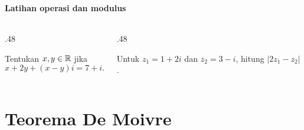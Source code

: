 \documentclass{../../kalkulus-ppt}
\begin{document}
\begin{frame}
    \frametitle{\insertsection}
    \framesubtitle{Latihan operasi dan modulus}
    \begin{columns}[T,onlytextwidth]
        \begin{column}{.48\textwidth}
            \begin{contoh}
                Tentukan $x,y\in\mathbb{R}$ jika
                \[
                    x+2y+(x-y)i=7+i.
                \]
            \end{contoh}
        \end{column}
        \begin{column}{.48\textwidth}
            \begin{contoh}
                Untuk $z_1=1+2i$ dan $z_2=3-i$, hitung $|2z_1-z_2|$.
            \end{contoh}
        \end{column}
    \end{columns}
\end{frame}

\section{Teorema De Moivre}
\end{document}
